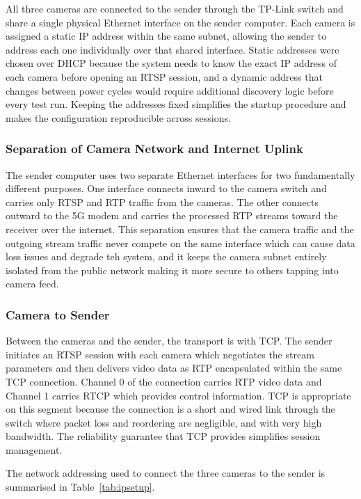 All three cameras are connected to the sender through the TP-Link switch and share a single physical Ethernet interface on the sender computer. Each camera is assigned a static IP address within the same subnet, allowing the sender to address each one individually over that shared interface. Static addresses were chosen over DHCP because the system needs to know the exact IP address of each camera before opening an RTSP session, and a dynamic address that changes between power cycles would require additional discovery logic before every test run. Keeping the addresses fixed simplifies the startup procedure and makes the configuration reproducible across sessions.

\subsubsection{Separation of Camera Network and Internet Uplink}

The sender computer uses two separate Ethernet interfaces for two fundamentally different purposes. One interface connects inward to the camera switch and carries only RTSP and RTP traffic from the cameras. The other connects outward to the 5G modem and carries the processed RTP streams toward the receiver over the internet. This separation ensures that the camera traffic and the outgoing stream traffic never compete on the same interface which can cause data loss issues and degrade teh system, and it keeps the camera subnet entirely isolated from the public network making it more secure to others tapping into camera feed.

\subsubsection{Camera to Sender}

Between the cameras and the sender, the transport is with TCP. The sender initiates an RTSP session with each camera which negotiates the stream parameters and then delivers video data as RTP encapsulated within the same TCP connection. Channel 0 of the connection carries RTP video data and Channel 1 carries RTCP which provides control information. TCP is appropriate on this segment because the connection is a short and wired link through the switch where packet loss and reordering are negligible, and with very high bandwidth. The reliability guarantee that TCP provides simplifies session management.

The network addressing used to connect the three cameras to the sender is summarised in Table~\ref{tab:ipsetup}.

